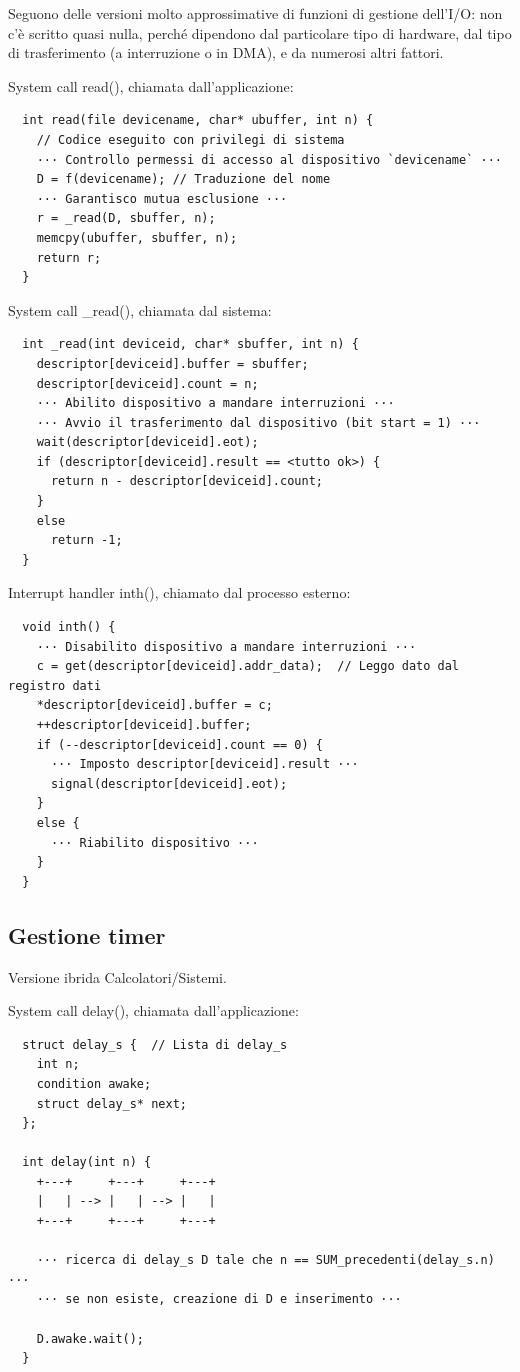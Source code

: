 \documentclass[12pt,a4paper]{article}
\begin{document}
Seguono delle versioni molto approssimative di funzioni di gestione
dell'I/O: non c'è scritto quasi nulla, perché dipendono dal particolare
tipo di hardware, dal tipo di trasferimento (a interruzione o in DMA),
e da numerosi altri fattori.

System call read(), chiamata dall'applicazione:
\begin{verbatim}
  int read(file devicename, char* ubuffer, int n) {
    // Codice eseguito con privilegi di sistema
    ··· Controllo permessi di accesso al dispositivo `devicename` ···
    D = f(devicename); // Traduzione del nome
    ··· Garantisco mutua esclusione ···
    r = _read(D, sbuffer, n);
    memcpy(ubuffer, sbuffer, n);
    return r;
  }
\end{verbatim}

System call \_read(), chiamata dal sistema:
\begin{verbatim}
  int _read(int deviceid, char* sbuffer, int n) {
    descriptor[deviceid].buffer = sbuffer;
    descriptor[deviceid].count = n;
    ··· Abilito dispositivo a mandare interruzioni ···
    ··· Avvio il trasferimento dal dispositivo (bit start = 1) ···
    wait(descriptor[deviceid].eot);
    if (descriptor[deviceid].result == <tutto ok>) {
      return n - descriptor[deviceid].count;
    }
    else
      return -1;
  }
\end{verbatim}

Interrupt handler inth(), chiamato dal processo esterno:
\begin{verbatim}
  void inth() {
    ··· Disabilito dispositivo a mandare interruzioni ···
    c = get(descriptor[deviceid].addr_data);  // Leggo dato dal registro dati
    *descriptor[deviceid].buffer = c;
    ++descriptor[deviceid].buffer;
    if (--descriptor[deviceid].count == 0) {
      ··· Imposto descriptor[deviceid].result ···
      signal(descriptor[deviceid].eot);
    }
    else {
      ··· Riabilito dispositivo ···
    }
  }
\end{verbatim}

\subsection{Gestione timer}
Versione ibrida Calcolatori/Sistemi.

System call delay(), chiamata dall'applicazione:
\begin{verbatim}
  struct delay_s {  // Lista di delay_s
    int n;
    condition awake;
    struct delay_s* next;
  };

  int delay(int n) {
    +---+     +---+     +---+
    |   | --> |   | --> |   |
    +---+     +---+     +---+

    ··· ricerca di delay_s D tale che n == SUM_precedenti(delay_s.n) ···
    ··· se non esiste, creazione di D e inserimento ···

    D.awake.wait();
  }
\end{verbatim}
\end{document}
